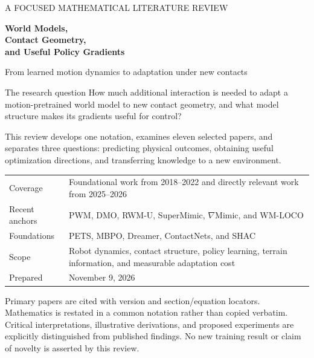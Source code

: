 \documentclass[11pt,a4paper]{article}
\begin{document}
\hypersetup{pageanchor=false}
\begin{titlepage}
\vspace*{12mm}
{\color{blue}\large A FOCUSED MATHEMATICAL LITERATURE REVIEW}\par
\vspace{8mm}
{\Huge\bfseries\color{ink}World Models,\\Contact Geometry,\\and Useful Policy Gradients}\par
\vspace{8mm}
{\Large From learned motion dynamics to adaptation under new contacts}\par
\vspace{10mm}
\begin{keyidea}{The research question}
How much additional interaction is needed to adapt a motion-pretrained world
model to new contact geometry, and what model structure makes its gradients
useful for control?
\end{keyidea}
\vspace{5mm}
This review develops one notation, examines eleven selected papers, and separates
three questions: predicting physical outcomes, obtaining useful optimization
directions, and transferring knowledge to a new environment.
\par
\vspace{6mm}
\begin{tabularx}{\linewidth}{@{}lX@{}}
Coverage & Foundational work from 2018--2022 and directly relevant work from 2025--2026\\
Recent anchors & PWM, DMO, RWM-U, SuperMimic, $\nabla$Mimic, and WM-LOCO\\
Foundations & PETS, MBPO, Dreamer, ContactNets, and SHAC\\
Scope & Robot dynamics, contact structure, policy learning, terrain information,
and measurable adaptation cost\\
Prepared & November 9, 2026\\
\end{tabularx}
\vfill
{\small Primary papers are cited with version and section/equation locators.
Mathematics is restated in a common notation rather than copied verbatim.
Critical interpretations, illustrative derivations, and proposed experiments
are explicitly distinguished from published findings. No new training result
or claim of novelty is asserted by this review.}
\end{titlepage}
\hypersetup{pageanchor=true}
\tableofcontents
\clearpage







\end{document}
